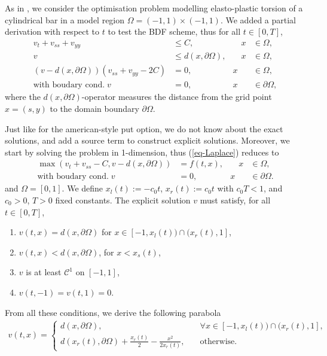 \documentclass[12pt,a4paper]{article}
\begin{document}
As in \cite{Oosterlee}, we consider the optimisation problem modelling elasto-plastic torsion of a cylindrical bar in a model region $\Omega = (-1,1) \times (-1,1)$. We added a partial derivation with respect to $t$ to test the BDF scheme, thus for all $t \in [0,T]$,
\begin{equation}
\label{eq-Laplace}
\begin{aligned}
	v_t + v_{ss} + v_{yy} &\leq C, & \quad x &\in \Omega, \\
	v &\leq d(x, \partial \Omega), & \quad x &\in \Omega, \\
	(v-d(x,\partial \Omega))(v_{ss} + v_{yy} - 2C) &= 0, \quad & x &\in \Omega, \\
	\text{with boudary cond.} \; v &= 0, \quad & x &\in \partial \Omega,
\end{aligned}
\end{equation}
where the $d(x, \partial \Omega)$-operator measures the distance from the grid point $x = (s,y)$ to the domain boundary $\partial \Omega$.

Just like for the american-style put option, we do not know about the exact solutions, and add a source term to construct explicit solutions. Moreover, we start by solving the problem in 1-dimension, thus (\ref{eq-Laplace}) reduces to
\begin{equation}
\label{eq-Laplace_1d}
\begin{aligned}
	\max(v_t + v_{ss} - C, v - d(x, \partial \Omega)) &= f(t,x), & \quad x &\in \Omega, \\
	\text{with boudary cond.} \; v &= 0, \quad & x &\in \partial \Omega.
\end{aligned}
\end{equation}
and $\Omega = [0,1]$.
We define $x_l(t) := -c_0 t$, $x_r(t) := c_0 t$ with $c_0 T < 1$, and $c_0>0$, $T>0$ fixed constants. The explicit solution $v$ must satisfy, for all $t \in [0,T]$,
\small{
\begin{enumerate}
	\item $v(t,x) = d(x, \partial \Omega)$ for $x \in [-1, x_l(t)) \cap (x_r(t), 1]$,
	\item $v(t,x) < d(x, \partial \Omega)$, for $x < x_s(t)$,
	\item $v$ is at least $\mathcal{C}^1$ on $[-1, 1]$,
	\item $v(t,-1) = v(t,1) = 0$.
\end{enumerate}}
From all these conditions, we derive the following parabola
\begin{align}
	v(t,x) = \left\lbrace \begin{array}{ll}
	d(x, \partial \Omega), \quad & \forall x \in [-1, x_l(t)) \cap (x_r(t), 1], \\
	d(x_r(t), \partial \Omega) + \frac{x_r(t)}{2} - \frac{x^2}{2 x_r(t)}, \quad & \text{otherwise}.	
	\end{array} \right. \label{eq-explicit_sol_ameroption2}
\end{align}
\end{document}

